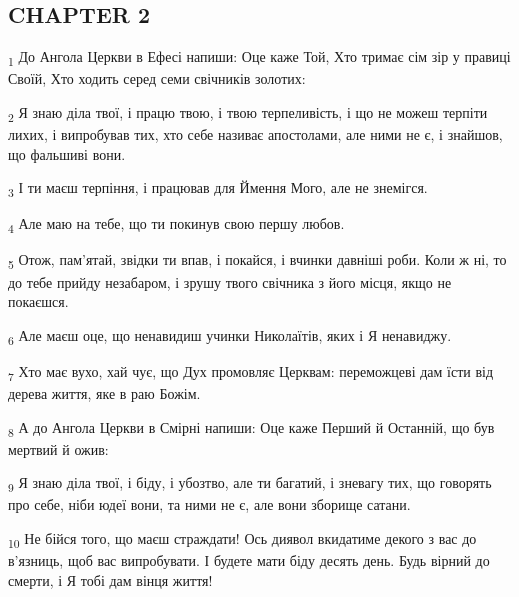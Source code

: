\subsection{CHAPTER 2}
\begin{tcolorbox}
\textsubscript{1} До Ангола Церкви в Ефесі напиши: Оце каже Той, Хто тримає сім зір у правиці Своїй, Хто ходить серед семи свічників золотих:
\end{tcolorbox}
\begin{tcolorbox}
\textsubscript{2} Я знаю діла твої, і працю твою, і твою терпеливість, і що не можеш терпіти лихих, і випробував тих, хто себе називає апостолами, але ними не є, і знайшов, що фальшиві вони.
\end{tcolorbox}
\begin{tcolorbox}
\textsubscript{3} І ти маєш терпіння, і працював для Ймення Мого, але не знемігся.
\end{tcolorbox}
\begin{tcolorbox}
\textsubscript{4} Але маю на тебе, що ти покинув свою першу любов.
\end{tcolorbox}
\begin{tcolorbox}
\textsubscript{5} Отож, пам'ятай, звідки ти впав, і покайся, і вчинки давніші роби. Коли ж ні, то до тебе прийду незабаром, і зрушу твого свічника з його місця, якщо не покаєшся.
\end{tcolorbox}
\begin{tcolorbox}
\textsubscript{6} Але маєш оце, що ненавидиш учинки Николаїтів, яких і Я ненавиджу.
\end{tcolorbox}
\begin{tcolorbox}
\textsubscript{7} Хто має вухо, хай чує, що Дух промовляє Церквам: переможцеві дам їсти від дерева життя, яке в раю Божім.
\end{tcolorbox}
\begin{tcolorbox}
\textsubscript{8} А до Ангола Церкви в Смірні напиши: Оце каже Перший й Останній, що був мертвий й ожив:
\end{tcolorbox}
\begin{tcolorbox}
\textsubscript{9} Я знаю діла твої, і біду, і убозтво, але ти багатий, і зневагу тих, що говорять про себе, ніби юдеї вони, та ними не є, але вони зборище сатани.
\end{tcolorbox}
\begin{tcolorbox}
\textsubscript{10} Не бійся того, що маєш страждати! Ось диявол вкидатиме декого з вас до в'язниць, щоб вас випробувати. І будете мати біду десять день. Будь вірний до смерти, і Я тобі дам вінця життя!
\end{tcolorbox}
